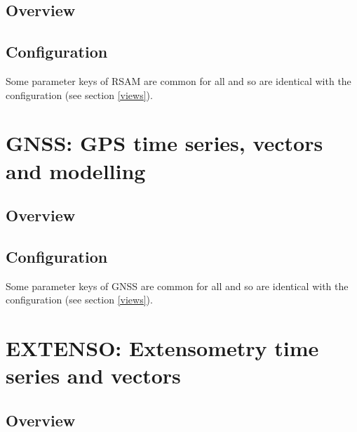 \subsection{Overview}

\subsection{Configuration}

Some parameter keys of RSAM are common for all  and  so are identical with the  configuration (see section \ref{views}).




\section{GNSS: GPS time series, vectors and modelling}

\subsection{Overview}

\subsection{Configuration}

Some parameter keys of GNSS are common for all  and  so are identical with the  configuration (see section \ref{views}).




\section{EXTENSO: Extensometry time series and vectors}

\subsection{Overview}


